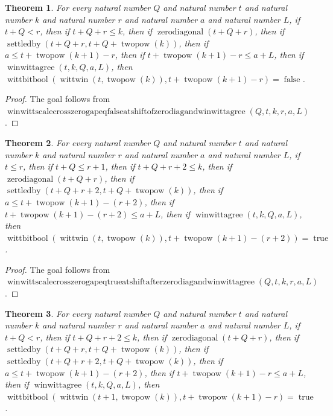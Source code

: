 \documentclass[11pt]{article}
\newtheorem{theorem}{Theorem}[section]
\theoremstyle{definition}
\begin{document}
\begin{theorem}
\label{ll:paper:winwitt-scale-cross-zero-gap-eq-false-at-shift-of-zero-diag-and-winwittagree}
For every natural number \(Q\) and natural number \(t\) and natural number \(k\) and natural number \(r\) and natural number \(a\) and natural number \(L\), if \(t + Q < r\), then if \(t + Q + r \le k\), then if \(\operatorname{zerodiagonal}(t + Q + r)\), then if \(\operatorname{settledby}(t + Q + r, t + Q + \operatorname{twopow}(k))\), then if \(a \le t + \operatorname{twopow}(k + 1) - r\), then if \(t + \operatorname{twopow}(k + 1) - r \le a + L\), then if \(\operatorname{winwittagree}(t, k, Q, a, L)\), then \(\operatorname{wittbitbool}(\operatorname{wittwin}(t, \operatorname{twopow}(k)), t + \operatorname{twopow}(k + 1) - r) = \operatorname{false}\).
\end{theorem}
\begin{proof}
The goal follows from \(\operatorname{winwittscalecrosszerogapeqfalseatshiftofzerodiagandwinwittagree}(Q, t, k, r, a, L)\).
\end{proof}
\begin{theorem}
\label{ll:paper:winwitt-scale-cross-zero-gap-eq-true-at-shift-after-zero-diag-and-winwittagree}
For every natural number \(Q\) and natural number \(t\) and natural number \(k\) and natural number \(r\) and natural number \(a\) and natural number \(L\), if \(t \le r\), then if \(t + Q \le r + 1\), then if \(t + Q + r + 2 \le k\), then if \(\operatorname{zerodiagonal}(t + Q + r)\), then if \(\operatorname{settledby}(t + Q + r + 2, t + Q + \operatorname{twopow}(k))\), then if \(a \le t + \operatorname{twopow}(k + 1) - (r + 2)\), then if \(t + \operatorname{twopow}(k + 1) - (r + 2) \le a + L\), then if \(\operatorname{winwittagree}(t, k, Q, a, L)\), then \(\operatorname{wittbitbool}(\operatorname{wittwin}(t, \operatorname{twopow}(k)), t + \operatorname{twopow}(k + 1) - (r + 2)) = \operatorname{true}\).
\end{theorem}
\begin{proof}
The goal follows from \(\operatorname{winwittscalecrosszerogapeqtrueatshiftafterzerodiagandwinwittagree}(Q, t, k, r, a, L)\).
\end{proof}
\begin{theorem}
\label{ll:paper:winwitt-scale-cross-zero-gap-step-one-eq-true-at-shift-of-zero-diag-and-single-winwittagree}
For every natural number \(Q\) and natural number \(t\) and natural number \(k\) and natural number \(r\) and natural number \(a\) and natural number \(L\), if \(t + Q < r\), then if \(t + Q + r + 2 \le k\), then if \(\operatorname{zerodiagonal}(t + Q + r)\), then if \(\operatorname{settledby}(t + Q + r, t + Q + \operatorname{twopow}(k))\), then if \(\operatorname{settledby}(t + Q + r + 2, t + Q + \operatorname{twopow}(k))\), then if \(a \le t + \operatorname{twopow}(k + 1) - (r + 2)\), then if \(t + \operatorname{twopow}(k + 1) - r \le a + L\), then if \(\operatorname{winwittagree}(t, k, Q, a, L)\), then \(\operatorname{wittbitbool}(\operatorname{wittwin}(t + 1, \operatorname{twopow}(k)), t + \operatorname{twopow}(k + 1) - r) = \operatorname{true}\).
\end{theorem}
\end{document}
